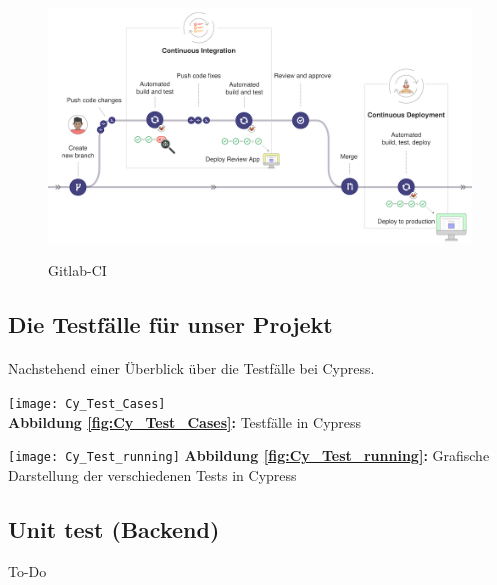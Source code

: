 \begin{figure}[ht]
	\centering
    \includegraphics[width=\textwidth]{sources/Gitlab-CI.png}\cite{MG10}
	\caption{Gitlab-CI}
	\label{Continuous integration workflow } {\cite{GLAB1}}
\end{figure}


\subsection{Die Testfälle für unser Projekt}
\paragraph{}
Nachstehend einer Überblick über die Testfälle bei Cypress.
\\
\begin{center}
\texttt{[image: Cy\_Test\_Cases]}\label{fig:Cy_Test_Cases}\\
\textbf{Abbildung \autoref{fig:Cy_Test_Cases}:} Testfälle in Cypress
\end{center}

\begin{center}
\texttt{[image: Cy\_Test\_running]}\label{fig:Cy_Test_running}
\textbf{Abbildung \autoref{fig:Cy_Test_running}:} Grafische Darstellung der verschiedenen Tests in Cypress
\end{center}



\subsection{Unit test (Backend)}
To-Do



